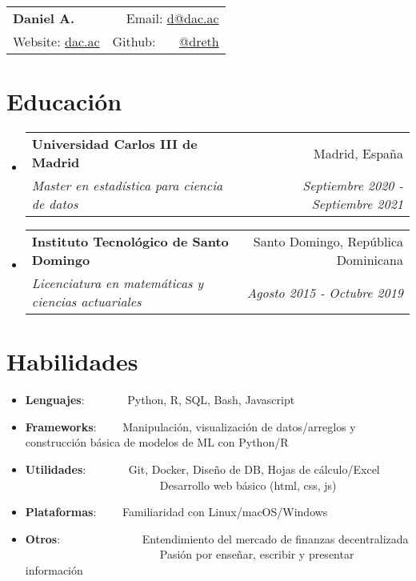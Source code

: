 \documentclass[a4paper,20pt]{article}
\makeatletter
\newcommand{\resumeItem}[2]{
  \item\small{
    \textbf{#1}{: #2 \vspace{-2pt}}
  }
}
\newcommand{\resumeSubheading}[4]{
  \vspace{-1pt}\item
    \begin{tabular*}{0.97\textwidth}{l@{\extracolsep{\fill}}r}
      \textbf{#1} & #2 \\
      \textit{#3} & \textit{#4} \\
    \end{tabular*}\vspace{-5pt}
}
\newcommand{\resumeSubItem}[2]{\resumeItem{#1}{#2}\vspace{-3pt}}
\newcommand{\resumeSubHeadingListStart}{\begin{itemize}[leftmargin=*]}
\newcommand{\resumeSubHeadingListEnd}{\end{itemize}}
\makeatother
\begin{document}
\begin{tabular*}{\textwidth}{l@{\extracolsep{\fill}}r}
  \textbf{{\LARGE Daniel A.}} & Email: {\color{blue}\href{mailto:}{d@dac.ac}}\\
  Website: {\color{blue}\href{https://dac.ac}{dac.ac}} & Github: ~~~{\color{blue}\href{https://github.com/dreth}{@dreth}}
\end{tabular*}




            
\vspace{-4pt}
\section{Educación}
\resumeSubHeadingListStart
        
  \resumeSubheading
    {Universidad Carlos III de Madrid}{Madrid, España}
    {Master en estadística para ciencia de datos}{Septiembre 2020 - Septiembre 2021}
\vspace{-2pt}
  \resumeSubheading
    {Instituto Tecnológico de Santo Domingo}{Santo Domingo, República Dominicana}
    {Licenciatura en matemáticas y ciencias actuariales}{Agosto 2015 - Octubre 2019}
\resumeSubHeadingListEnd


            
\vspace{-7pt}
\section{Habilidades}
  \resumeSubHeadingListStart
            
        
\vspace{-2pt}
\resumeSubItem{Lenguajes}{~~~~~~~Python, R, SQL, Bash, Javascript}
\vspace{-2pt}
\resumeSubItem{Frameworks}{~~~~Manipulación, visualización de datos/arreglos y construcción básica de modelos de ML con Python/R}
\vspace{-2pt}
\resumeSubItem{Utilidades}{~~~~~~~Git, Docker, Diseño de DB, Hojas de cálculo/Excel\\~~~~~~~~~~~~~~~~~~~~~~~~Desarrollo web básico (html, css, js)}
\vspace{-2pt}
\resumeSubItem{Plataformas}{~~~~Familiaridad con Linux/macOS/Windows}
\vspace{-2pt}
\resumeSubItem{Otros}{~~~~~~~~~~~~~~Entendimiento del mercado de finanzas decentralizada\\~~~~~~~~~~~~~~~~~~~~~~~~Pasión por enseñar, escribir y presentar información}
\resumeSubHeadingListEnd
\end{document}
